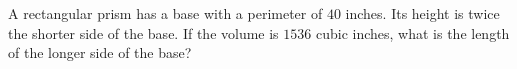 A rectangular prism has a base with a perimeter of $40$ inches. Its height is twice the shorter side of the base. If the volume is $1536$ cubic inches, what is the length of the longer side of the base?

